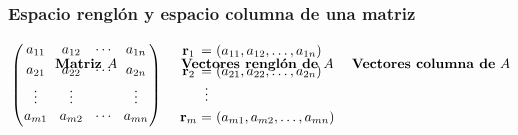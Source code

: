 
\subsection{}

{\nologo
\begin{frame}\frametitle{Espacio renglón y espacio columna de una matriz}

\begin{columns}[c]
	\begin{column}{1.15\textwidth}
		\[
		\begin{array}{@{\hspace{0.1\tabcolsep}}c@{\hspace{2\tabcolsep}}c@{\hspace{2\tabcolsep}}c@{\hspace{0.1\tabcolsep}}}
		\text{\textbf{Matriz }} A & \text{\textbf{Vectores renglón de }} A & \text{\textbf{Vectores columna de} } A \\[-8mm] 
		{\left(
			\begin{array}{@{\hspace{0.1\tabcolsep}}c@{\hspace{1.5\tabcolsep}}c@{\hspace{1.5\tabcolsep}}c@{\hspace{1.5\tabcolsep}}c@{\hspace{0.1\tabcolsep}}}
			a_{11} & a_{12} & \cdots & a_{1n} \\[1mm]
			a_{21} & a_{22} & \cdots & a_{2n} \\[1mm]
			\vdots & \vdots &        & \vdots \\[0mm]
			a_{m1} & a_{m2} & \cdots & a_{mn} \\[1mm]
			\end{array}
			\right)
			\atop		
		}
		& 
		\begin{array}{@{\hspace{0.1\tabcolsep}}c@{\hspace{0.5\tabcolsep}}c@{\hspace{0.5\tabcolsep}}l@{\hspace{0.1\tabcolsep}}}
		\mathbf{r}_1 & = & (a_{11},a_{12},\hdots, a_{1n})\\[1mm]
		\mathbf{r}_2 & = & (a_{21},a_{22},\hdots, a_{2n})\\
		& \vdots & \\[1mm]
		\mathbf{r}_m  & = & (a_{m1},a_{m2},\hdots, a_{mn})\\[1.1cm]

\end{array}
\end{array}\]
\end{column}
\end{columns}
\end{frame}}
